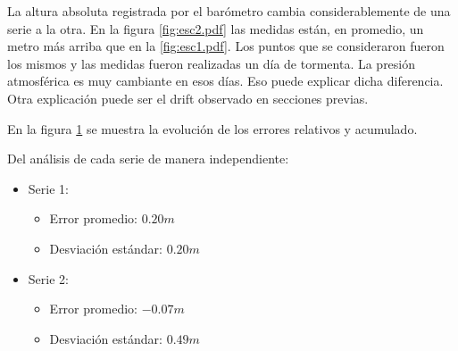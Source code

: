 \documentclass[main]{subfiles}
\begin{document}
La altura absoluta registrada por el bar\'ometro cambia considerablemente de una serie a la otra. En la figura \ref{fig:esc2.pdf} las medidas est\'an, en promedio, un metro m\'as arriba que en la \ref{fig:esc1.pdf}. Los puntos que se consideraron fueron los mismos y las medidas fueron realizadas un d\'ia de tormenta. La presi\'on atmosf\'erica es muy cambiante en esos d\'ias. Eso puede explicar dicha diferencia. Otra explicaci\'on puede ser el drift observado en secciones previas.

En la figura \ref{fig:1-metro-err} se muestra la evoluci\'on de los errores relativos y acumulado.

\begin{figure}
\vspace{-25pt}

  \caption{}
\label{fig:1-metro-err}
\vspace{-110pt}
\end{figure}

Del an\'alisis de cada serie de manera independiente:
\begin{itemize}
\item Serie 1:
		\begin{itemize}
		\item Error promedio: $0.20m$
		\item Desviaci\'on est\'andar: $0.20m$
		\end{itemize}
\item Serie 2:
		\begin{itemize}
		\item Error promedio: $-0.07m$
		\item Desviaci\'on est\'andar: $0.49m$
		\end{itemize}
\end{itemize}
\end{document}
